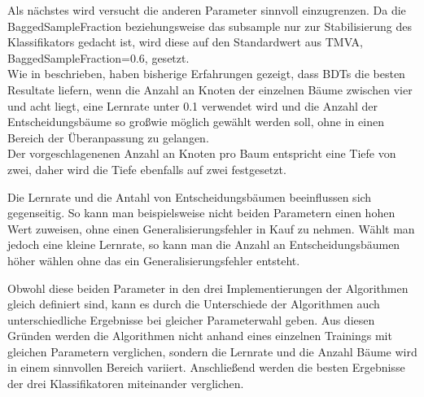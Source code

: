 Als n\"achstes wird versucht die anderen Parameter sinnvoll einzugrenzen. Da die BaggedSampleFraction beziehungsweise das subsample nur zur Stabilisierung des Klassifikators gedacht ist, wird diese auf den Standardwert aus TMVA, BaggedSampleFraction=\num{0,6}, gesetzt.\\
Wie in \cite{SWB-307748006} beschrieben, haben bisherige Erfahrungen gezeigt, dass BDTs die besten Resultate liefern, wenn die Anzahl an Knoten der einzelnen B\"aume zwischen vier und acht liegt, eine Lernrate unter \num{0,1} verwendet wird und die Anzahl der Entscheidungsb\"aume so gro\ss  wie m\"oglich gew\"ahlt werden soll, ohne in einen Bereich der \"Uberanpassung zu gelangen.\\
Der vorgeschlagenenen Anzahl an Knoten pro Baum entspricht eine Tiefe von zwei, daher wird die Tiefe ebenfalls auf zwei festgesetzt.

Die Lernrate und die Antahl von Entscheidungsb\"aumen beeinflussen sich gegenseitig. So kann man beispielsweise nicht beiden Parametern einen hohen Wert zuweisen, ohne einen Generalisierungsfehler in Kauf zu nehmen. W\"ahlt man jedoch eine kleine Lernrate, so kann man die Anzahl an Entscheidungsb\"aumen h\"oher w\"ahlen ohne das ein Generalisierungsfehler entsteht.

Obwohl diese beiden Parameter in den drei Implementierungen der Algorithmen gleich definiert sind, kann es durch die Unterschiede der Algorithmen auch unterschiedliche Ergebnisse bei gleicher Parameterwahl geben. Aus diesen Gr\"unden werden die Algorithmen nicht anhand eines einzelnen Trainings mit gleichen Parametern verglichen, sondern die Lernrate und die Anzahl B\"aume wird in einem sinnvollen Bereich variiert. Anschlie\ss end werden die besten Ergebnisse der drei Klassifikatoren miteinander verglichen.